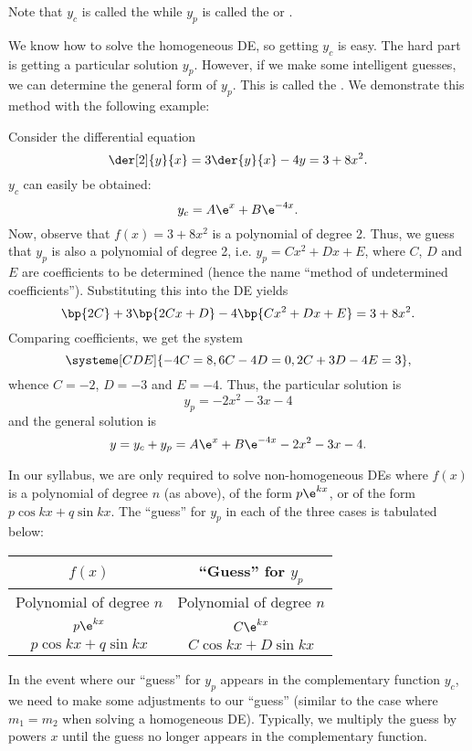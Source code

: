 Note that $y_c$ is called the  while $y_p$ is called the  or .

We know how to solve the homogeneous DE, so getting $y_c$ is easy. The hard part is getting a particular solution $y_p$. However, if we make some intelligent guesses, we can determine the general form of $y_p$. This is called the . We demonstrate this method with the following example:

\begin{example}
    Consider the differential equation \[\der[2]{y}{x} = 3\der{y}{x} - 4y = 3 + 8x^2.\] $y_c$ can easily be obtained: \[y_c = A\e^x + B\e^{-4x}.\] Now, observe that $f(x) = 3 + 8x^2$ is a polynomial of degree 2. Thus, we guess that $y_p$ is also a polynomial of degree 2, i.e. $y_p = Cx^2 + Dx + E$, where $C$, $D$ and $E$ are coefficients to be determined (hence the name ``method of undetermined coefficients''). Substituting this into the DE yields \[\bp{2C} + 3\bp{2Cx + D} - 4\bp{Cx^2 + Dx + E} = 3 + 8x^2.\] Comparing coefficients, we get the system \[\systeme[CDE]{-4C = 8,6C-4D = 0,2C + 3D - 4E = 3},\] whence $C = -2$, $D = -3$ and $E = -4$. Thus, the particular solution is \[y_p = -2x^2 - 3x - 4\] and the general solution is \[y = y_c + y_p = A\e^x + B\e^{-4x} - 2x^2 - 3x - 4.\]
\end{example}

In our syllabus, we are only required to solve non-homogeneous DEs where $f(x)$ is a polynomial of degree $n$ (as above), of the form $p\e^{kx}$, or of the form $p\cos kx + q\sin kx$. The ``guess'' for $y_p$ in each of the three cases is tabulated below:

\begin{table}[H]
    \centering
    \begin{tabular}{|c|c|}
    \hline
    $f(x)$ & \textbf{``Guess'' for $y_p$} \\ \hline\hline
    Polynomial of degree $n$ & Polynomial of degree $n$ \\ \hline
    $p\e^{kx}$ & $C \e^{kx}$ \\ \hline
    $p \cos kx + q \sin kx$ & $C \cos kx + D \sin kx$ \\ \hline
    \end{tabular}
\end{table}

In the event where our ``guess'' for $y_p$ appears in the complementary function $y_c$, we need to make some adjustments to our ``guess'' (similar to the case where $m_1 = m_2$ when solving a homogeneous DE). Typically, we multiply the guess by powers $x$ until the guess no longer appears in the complementary function.

